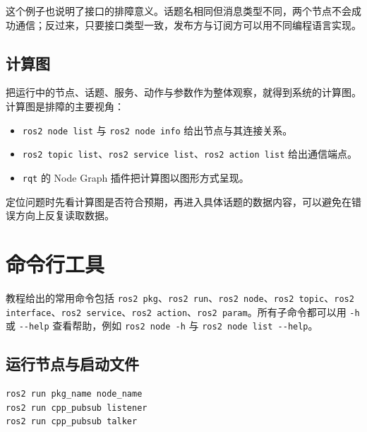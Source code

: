 这个例子也说明了接口的排障意义。话题名相同但消息类型不同，两个节点不会成功通信；反过来，只要接口类型一致，发布方与订阅方可以用不同编程语言实现。

\subsection{计算图}\label{ux8ba1ux7b97ux56fe}

把运行中的节点、话题、服务、动作与参数作为整体观察，就得到系统的计算图。计算图是排障的主要视角：

\begin{itemize}
\tightlist
\item
  \passthrough{\lstinline!ros2 node list!} 与
  \passthrough{\lstinline!ros2 node info!} 给出节点与其连接关系。
\item
  \passthrough{\lstinline!ros2 topic list!}、\passthrough{\lstinline!ros2 service list!}、\passthrough{\lstinline!ros2 action list!}
  给出通信端点。
\item
  \passthrough{\lstinline!rqt!} 的 Node Graph
  插件把计算图以图形方式呈现。
\end{itemize}

定位问题时先看计算图是否符合预期，再进入具体话题的数据内容，可以避免在错误方向上反复读取数据。

\section{命令行工具}\label{ux547dux4ee4ux884cux5de5ux5177}

教程给出的常用命令包括
\passthrough{\lstinline!ros2 pkg!}、\passthrough{\lstinline!ros2 run!}、\passthrough{\lstinline!ros2 node!}、\passthrough{\lstinline!ros2 topic!}、\passthrough{\lstinline!ros2 interface!}、\passthrough{\lstinline!ros2 service!}、\passthrough{\lstinline!ros2 action!}、\passthrough{\lstinline!ros2 param!}。所有子命令都可以用
\passthrough{\lstinline!-h!} 或 \passthrough{\lstinline!--help!}
查看帮助，例如 \passthrough{\lstinline!ros2 node -h!} 与
\passthrough{\lstinline!ros2 node list --help!}。

\subsection{运行节点与启动文件}\label{ux8fd0ux884cux8282ux70b9ux4e0eux542fux52a8ux6587ux4ef6}

\begin{lstlisting}[language=bash]
ros2 run pkg_name node_name
ros2 run cpp_pubsub listener
ros2 run cpp_pubsub talker
\end{lstlisting}


